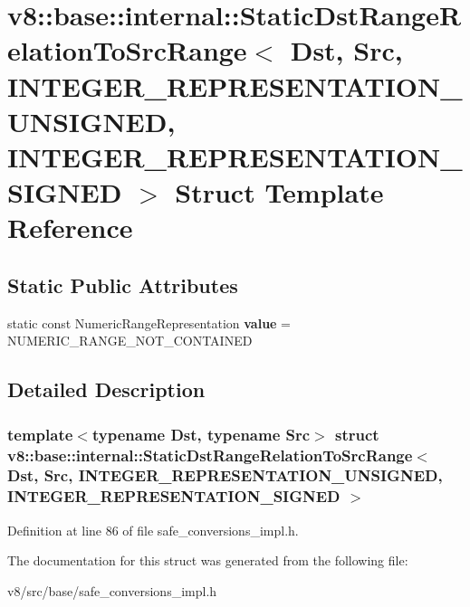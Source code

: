 \hypertarget{structv8_1_1base_1_1internal_1_1StaticDstRangeRelationToSrcRange_3_01Dst_00_01Src_00_01INTEGER__c5f1a6e7e1a76239a21a26ac823549f2}{}\section{v8\+:\+:base\+:\+:internal\+:\+:Static\+Dst\+Range\+Relation\+To\+Src\+Range$<$ Dst, Src, I\+N\+T\+E\+G\+E\+R\+\_\+\+R\+E\+P\+R\+E\+S\+E\+N\+T\+A\+T\+I\+O\+N\+\_\+\+U\+N\+S\+I\+G\+N\+ED, I\+N\+T\+E\+G\+E\+R\+\_\+\+R\+E\+P\+R\+E\+S\+E\+N\+T\+A\+T\+I\+O\+N\+\_\+\+S\+I\+G\+N\+ED $>$ Struct Template Reference}
\label{structv8_1_1base_1_1internal_1_1StaticDstRangeRelationToSrcRange_3_01Dst_00_01Src_00_01INTEGER__c5f1a6e7e1a76239a21a26ac823549f2}
\subsection*{Static Public Attributes}
\begin{DoxyCompactItemize}
\item 
\mbox{\label{structv8_1_1base_1_1internal_1_1StaticDstRangeRelationToSrcRange_3_01Dst_00_01Src_00_01INTEGER__c5f1a6e7e1a76239a21a26ac823549f2_ab7e0dcf2070391283b390f6cdd3cd0cc}} 
static const Numeric\+Range\+Representation {\bfseries value} = N\+U\+M\+E\+R\+I\+C\+\_\+\+R\+A\+N\+G\+E\+\_\+\+N\+O\+T\+\_\+\+C\+O\+N\+T\+A\+I\+N\+ED
\end{DoxyCompactItemize}


\subsection{Detailed Description}
\subsubsection*{template$<$typename Dst, typename Src$>$\newline
struct v8\+::base\+::internal\+::\+Static\+Dst\+Range\+Relation\+To\+Src\+Range$<$ Dst, Src, I\+N\+T\+E\+G\+E\+R\+\_\+\+R\+E\+P\+R\+E\+S\+E\+N\+T\+A\+T\+I\+O\+N\+\_\+\+U\+N\+S\+I\+G\+N\+E\+D, I\+N\+T\+E\+G\+E\+R\+\_\+\+R\+E\+P\+R\+E\+S\+E\+N\+T\+A\+T\+I\+O\+N\+\_\+\+S\+I\+G\+N\+E\+D $>$}



Definition at line 86 of file safe\+\_\+conversions\+\_\+impl.\+h.



The documentation for this struct was generated from the following file\+:\begin{DoxyCompactItemize}
\item 
v8/src/base/safe\+\_\+conversions\+\_\+impl.\+h\end{DoxyCompactItemize}
